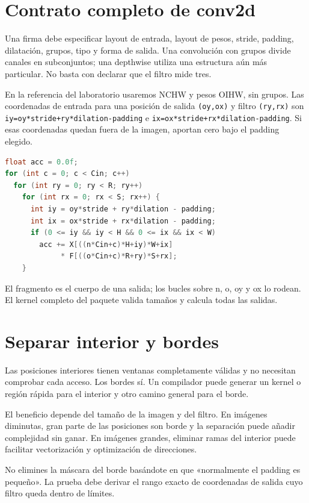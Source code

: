 \documentclass[12pt,a4paper,oneside]{report}
\begin{document}
\section{Contrato completo de conv2d}
Una firma debe especificar layout de entrada, layout de pesos, stride, padding, dilatación, grupos, tipo y forma de salida. Una convolución con grupos divide canales en subconjuntos; una depthwise utiliza una estructura aún más particular. No basta con declarar que el filtro mide tres.

En la referencia del laboratorio usaremos NCHW y pesos OIHW, sin grupos. Las coordenadas de entrada para una posición de salida \texttt{(oy,ox)} y filtro \texttt{(ry,rx)} son \texttt{iy=oy*stride\allowbreak{}+ry*dilation\allowbreak{}-padding} e \texttt{ix=ox*stride\allowbreak{}+rx*dilation\allowbreak{}-padding}. Si esas coordenadas quedan fuera de la imagen, aportan cero bajo el padding elegido.

\begin{lstlisting}[language=C]
float acc = 0.0f;
for (int c = 0; c < Cin; c++)
  for (int ry = 0; ry < R; ry++)
    for (int rx = 0; rx < S; rx++) {
      int iy = oy*stride + ry*dilation - padding;
      int ix = ox*stride + rx*dilation - padding;
      if (0 <= iy && iy < H && 0 <= ix && ix < W)
        acc += X[((n*Cin+c)*H+iy)*W+ix]
             * F[((o*Cin+c)*R+ry)*S+rx];
    }
\end{lstlisting}
El fragmento es el cuerpo de una salida; los bucles sobre n, o, oy y ox lo rodean. El kernel completo del paquete valida tamaños y calcula todas las salidas.

\section{Separar interior y bordes}
Las posiciones interiores tienen ventanas completamente válidas y no necesitan comprobar cada acceso. Los bordes sí. Un compilador puede generar un kernel o región rápida para el interior y otro camino general para el borde.

El beneficio depende del tamaño de la imagen y del filtro. En imágenes diminutas, gran parte de las posiciones son borde y la separación puede añadir complejidad sin ganar. En imágenes grandes, eliminar ramas del interior puede facilitar vectorización y optimización de direcciones.

No elimines la máscara del borde basándote en que «normalmente el padding es pequeño». La prueba debe derivar el rango exacto de coordenadas de salida cuyo filtro queda dentro de límites.
\end{document}

